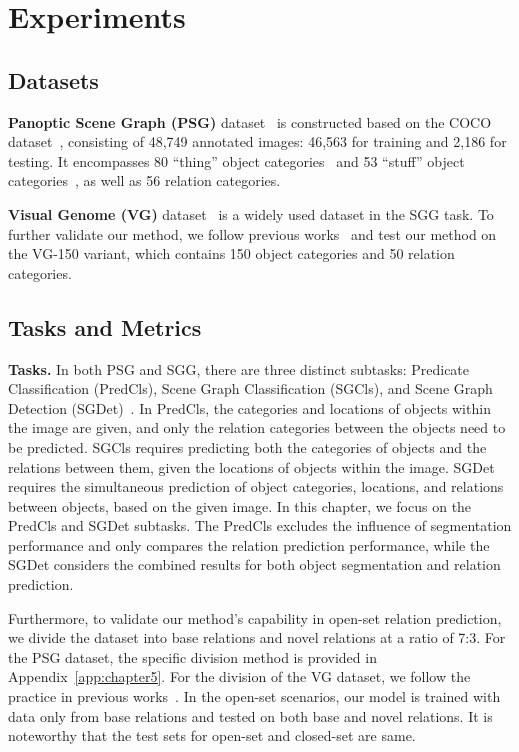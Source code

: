 \section{Experiments}
\label{openpsg:sec:experiments}


\subsection{Datasets}

\noindent \textbf{Panoptic Scene Graph (PSG)} dataset~\citep{yang2022panoptic} is constructed based on the COCO dataset~\citep{lin2014microsoft, caesar2018coco}, consisting of 48,749 annotated images: 46,563 for training and 2,186 for testing. 
It encompasses 80 ``thing'' object categories~\citep{lin2014microsoft} and 53 ``stuff'' object categories~\citep{caesar2018coco}, as well as 56 relation categories.

\noindent \textbf{Visual Genome (VG)} dataset~\citep{krishna2017visual} is a widely used dataset in the SGG task.
To further validate our method, we follow previous works~\citep{yu2023visually, chen2023expanding} and test our method on the VG-150 variant, which contains 150 object categories and 50 relation categories.


\subsection{Tasks and Metrics}

\noindent \textbf{Tasks.}
In both PSG and SGG, there are three distinct subtasks: Predicate Classification (PredCls), Scene Graph Classification (SGCls), and Scene Graph Detection (SGDet)~\citep{xu2017scene}.
In PredCls, the categories and locations of objects within the image are given, and only the relation categories between the objects need to be predicted.
SGCls requires predicting both the categories of objects and the relations between them, given the locations of objects within the image.
SGDet requires the simultaneous prediction of object categories, locations, and relations between objects, based on the given image.
In this chapter, we focus on the PredCls and SGDet subtasks.
The PredCls excludes the influence of segmentation performance and only compares the relation prediction performance, while the SGDet considers the combined results for both object segmentation and relation prediction.

Furthermore, to validate our method's capability in open-set relation prediction, we divide the dataset into base relations and novel relations at a ratio of 7:3.
For the PSG dataset, the specific division method is provided in Appendix~\ref{app:chapter5}.
For the division of the VG dataset, we follow the practice in previous works~\citep{yu2023visually, chen2023expanding}.
In the open-set scenarios, our model is trained with data only from base relations and tested on both base and novel relations.
It is noteworthy that the test sets for open-set and closed-set are same.


